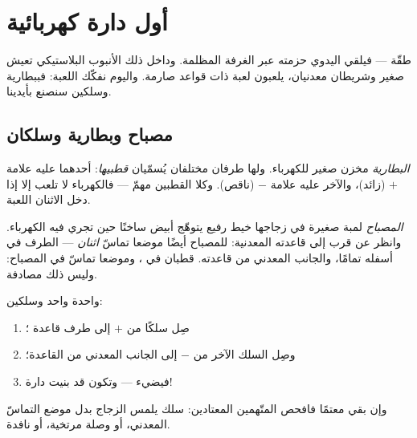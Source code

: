 \chapter{أول دارة كهربائية}\label{ch:g3:first-electric-circuit}

طقّة --- فيلقي  اليدوي حزمته عبر الغرفة المظلمة. وداخل ذلك
الأنبوب البلاستيكي تعيش   صغير وشريطان معدنيان،
يلعبون لعبة ذات قواعد صارمة. واليوم نفكّك اللعبة: فببطارية 
وسلكين سنصنع  بأيدينا.

\section{مصباح وبطارية وسلكان}

\begin{definition}[البطارية]\label{def:g3:first-electric-circuit:battery}
\emph{البطارية} مخزن صغير للكهرباء. ولها طرفان
مختلفان يُسمّيان \emph{قطبيها}: أحدهما عليه علامة $+$
(زائد)، والآخر عليه علامة $-$ (ناقص). وكلا القطبين مهمّ ---
فالكهرباء لا تلعب إلا إذا دخل الاثنان اللعبة.
\end{definition}

\begin{definition}[المصباح]\label{def:g3:first-electric-circuit:bulb}
\emph{المصباح} لمبة صغيرة في زجاجها خيط رفيع يتوهّج
أبيض ساخنًا حين تجري فيه الكهرباء. وانظر عن قرب إلى قاعدته
المعدنية: للمصباح أيضًا موضعا تماسّ \emph{اثنان} --- الطرف في
أسفله تمامًا، والجانب المعدني من قاعدته. قطبان في ،
وموضعا تماسّ في المصباح: وليس ذلك مصادفة.
\end{definition}

\begin{method}\label{met:g3:first-electric-circuit:light}
 واحدة  واحد وسلكين:
\begin{enumerate}
  \item صِل سلكًا من   $+$ إلى طرف قاعدة ؛
  \item وصِل السلك الآخر من   $-$ إلى الجانب المعدني
        من القاعدة؛
  \item فيضيء  --- وتكون قد بنيت دارة!
\end{enumerate}
وإن بقي معتمًا فافحص المتّهمين المعتادين: سلك يلمس الزجاج بدل
موضع التماسّ المعدني، أو وصلة مرتخية، أو  نافدة.
\end{method}

